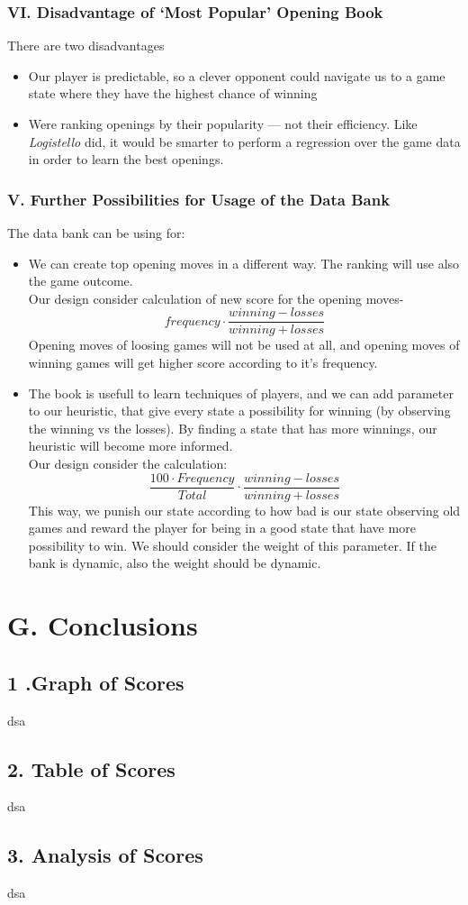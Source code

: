\documentclass{article}
\begin{document}
\subsubsection*{VI. Disadvantage of `Most Popular' Opening Book}
There are two disadvantages
\begin{itemize}
\item Our player is predictable, so a clever opponent could navigate us to a game state where they have the highest chance of winning
\item Were ranking openings by their popularity --- not their efficiency. Like \emph{Logistello} did, it would be smarter to perform a regression over the game data in order to learn the best openings.
\end{itemize}

\subsubsection*{V. Further Possibilities for Usage of the Data Bank}
The data bank can be using for:
\begin{itemize}
\item We can create top opening moves in a different way. The ranking will use also the game outcome.\\
Our design consider calculation of new score for the opening moves-
$$frequency \cdot \frac {winning - losses}{winning+ losses} $$
Opening moves of loosing games will not be used at all, and opening moves of winning games will get higher score according to it's frequency.
\item The book is usefull to learn techniques of players, and we can add parameter to our heuristic, that give every state a possibility for winning (by observing the winning vs the losses). By finding a state that has more winnings, our  heuristic will become more informed.\\
Our design consider the calculation:
$$\frac {100 \cdot Frequency}{Total} \cdot \frac {winning - losses}{winning+ losses} $$
This way, we punish our state according to how bad is our state observing old games and reward the player for being in a good state that have more possibility to win. We should consider the weight of this parameter. If the bank is dynamic, also the weight should be dynamic.
\end{itemize}

\section*{G. Conclusions}
\subsection*{1 .Graph of Scores}
dsa

\subsection*{2. Table of Scores}
dsa

\subsection*{3. Analysis of Scores}
dsa
\end{document}
